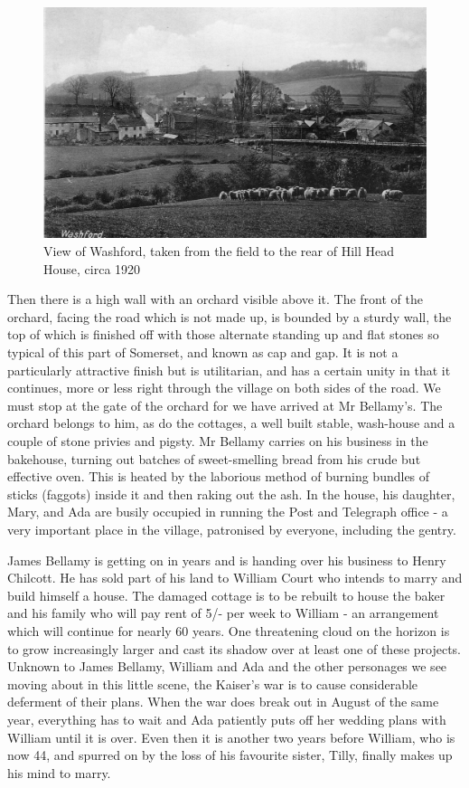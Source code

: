 \begin{figure}[p]
     \includegraphics[width=1\textwidth]{figures/WashfordGarden1900}
     \caption{View of Washford, taken from the field to the rear of Hill Head House, circa 1920}
     \label{fig:GardenView}
\end{figure}

\afterpage{\clearpage}


Then there is a high wall with an orchard visible above it. The front of the orchard, facing the road which is not made up, is bounded by a sturdy wall, the top of which is finished off with those alternate standing up and flat stones so typical of this part of Somerset, and known as cap and gap. It is not a particularly attractive finish but is utilitarian, and has a certain unity in that it continues, more or less right through the village on both sides of the road. We must stop at the gate of the orchard for we have arrived at Mr Bellamy's. The orchard belongs to him, as do the cottages, a well built stable, wash-house and a couple of stone privies and pigsty. Mr Bellamy carries on his business in the bakehouse, turning out batches of sweet-smelling bread from his crude but effective oven. This is heated by the laborious method of burning bundles of sticks (faggots) inside it and then raking out the ash. In the house, his daughter, Mary, and Ada are busily occupied in running the Post and Telegraph office - a very important place in the village, patronised by everyone, including the gentry.

James Bellamy is getting on in years and is handing over his business to Henry Chilcott. He has sold part of his land to William Court who intends to marry and build himself a house. The damaged cottage is to be rebuilt to house the baker and his family who will pay rent of 5/- per week to William - an arrangement which will continue for nearly 60 years. One threatening cloud on the horizon is to grow increasingly larger and cast its shadow over at least one of these projects. Unknown to James Bellamy, William and Ada and the other personages we see moving about in this little scene, the Kaiser's war is to cause considerable deferment of their plans. When the war does break out in August of the same year, everything has to wait and Ada patiently puts off her wedding plans with William until it is over. Even then it is another two years before William, who is now 44, and spurred on by the loss of his favourite sister, Tilly, finally makes up his mind to marry.

